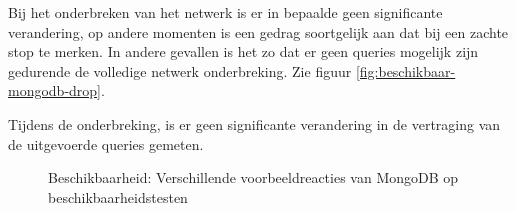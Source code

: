 Bij het onderbreken van het netwerk is er in bepaalde geen significante verandering, op andere momenten is een gedrag soortgelijk aan dat bij een zachte stop te merken. In andere gevallen is het zo dat er geen queries mogelijk zijn gedurende de volledige netwerk onderbreking. Zie figuur \ref{fig:beschikbaar-mongodb-drop}. 

Tijdens de onderbreking, is er geen significante verandering in de vertraging van de uitgevoerde queries gemeten. 
\begin{figure}[ht!] 
	\centering
	\caption{Beschikbaarheid: Verschillende voorbeeldreacties van MongoDB op beschikbaarheidstesten }
	\label{fig:beschikbaar-mongodb-1}
\end{figure}

